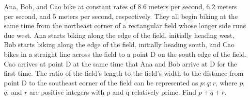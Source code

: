 Ana, Bob, and Cao bike at constant rates of $8.6$ meters per second, $6.2$ meters per second, and $5$ meters per second, respectively. They all begin biking at the same time from the northeast corner of a rectangular field whose longer side runs due west. Ana starts biking along the edge of the field, initially heading west, Bob starts biking along the edge of the field, initially heading south, and Cao bikes in a straight line across the field to a point D on the south edge of the field. Cao arrives at point D at the same time that Ana and Bob arrive at D for the first time. The ratio of the field's length to the field's width to the distance from point D to the southeast corner of the field can be represented as $p : q : r$, where $p$, $q$, and $r$ are positive integers with p and q relatively prime. Find $p + q + r$.